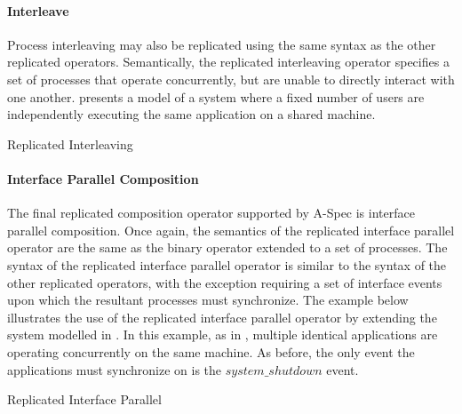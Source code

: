 \documentclass[letterpaper,10pt,draft]{book}
\begin{document}
\paragraph{Interleave}
   \label{sect:ReplInterleave}

Process interleaving may also be replicated using the same syntax as the other replicated
operators.  Semantically, the replicated interleaving operator specifies a set of
processes that operate concurrently, but are unable to directly interact with one
another.   presents a model of a system where a fixed number
of users are independently executing the same application on a shared machine.

\begin{example}
\begin{minipage}[t]{0.49\linewidth}
   
\end{minipage}
\begin{minipage}[t]{0.49\linewidth}
   \azbox
   
\end{minipage}

   \caption{Replicated Interleaving}
   \label{ex:ReplInterleave}
\end{example}

\paragraph{Interface Parallel Composition}
   \label{sect:ReplIFPar}

The final replicated composition operator supported by A-Spec is interface parallel
composition.  Once again, the semantics of the replicated interface parallel operator
are the same as the binary operator extended to a set of processes.  The syntax
of the replicated interface parallel operator is similar to the syntax of the other
replicated operators, with the exception requiring a set of interface events upon
which the resultant processes must synchronize.  The example below illustrates the
use of the replicated interface parallel operator by extending the system modelled
in .  In this example, as in , multiple
identical applications are operating concurrently on the same machine.  As before,
the only event the applications must synchronize on is the $system\_shutdown$ event.

\begin{example}
\begin{minipage}[t]{0.49\linewidth}
   
\end{minipage}
\begin{minipage}[t]{0.49\linewidth}
   \azbox
   
\end{minipage}

   \caption{Replicated Interface Parallel}
   \label{ex:ReplIFPar}
\end{example}
\end{document}
